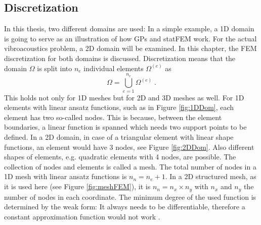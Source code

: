 \documentclass[%
  a4paper,oneside,%
  11pt,%
  smallchapters,
  style=printdev,
  extramargin,
  green,%
  rgb, <cmyk>
  ]{tubsbook}
\begin{document}
\subsection{Discretization}
In this thesis, two different domains are used: In a simple example, a 1D domain is going to serve as an illustration of how GPs and statFEM work. For the actual vibroacoustics problem, a 2D domain will be examined. In this chapter, the FEM discretization for both domains is discussed.
%
Discretization means that the domain $\Omega$ is split into $n_e$ individual elements $\Omega^{(e)}$ as
\begin{equation}
\Omega = \bigcup_{e=1}^{n_e} \Omega^{(e)} \;.
\end{equation}
This holds not only for 1D meshes but for 2D and 3D meshes as well.
For 1D elements with linear ansatz functions, such as in Figure \ref{fig:1DDom}, each element has two so-called nodes. This is because, between the element boundaries, a linear function is spanned which needs two support points to be defined.  In a 2D domain, in case of a triangular element with linear shape functions, an element would have 3 nodes, see Figure \ref{fig:2DDom}. Also different shapes of elements, e.g. quadratic elements with 4 nodes, are possible. The collection of nodes and elements is called a mesh. The total number of nodes in a 1D mesh with linear ansatz functions is $n_n = n_e + 1$. In a 2D structured mesh, as it is used here (see Figure \ref{fig:meshFEM}), it is $n_n = n_x \times n_y$ with $n_x$ and $n_y$ the number of nodes in each coordinate. The minimum degree of the used function is determined by the weak form: It always needs to be differentiable, therefore a constant approximation function would not work \cite{atalla2015}. 
\end{document}
